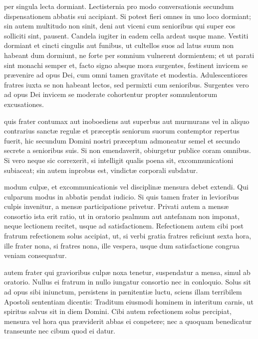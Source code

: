 \documentclass[fontsize=9pt,paper=A6,twoside,BCOR=1mm,DIV=22,headinclude]{scrarticle}
\begin{document}
\begin{multicols}{2}
 per singula lecta dormiant. Lectisternia pro modo conversationis secundum dispensationem abbatis sui accipiant. Si potest fieri omnes in uno loco dormiant; sin autem multitudo non sinit, deni aut viceni cum senioribus qui super eos solliciti sint, pausent. Candela iugiter in eadem cella ardeat usque mane. Vestiti dormiant et cincti cingulis aut funibus, ut cultellos suos ad latus suum non habeant dum dormiunt, ne forte per somnium vulnerent dormientem; et ut parati sint monachi semper et, facto signo absque mora surgentes, festinent invicem se prævenire ad opus Dei, cum omni tamen gravitate et modestia. Adulescentiores fratres iuxta se non habeant lectos, sed permixti cum senioribus. Surgentes vero ad opus Dei invicem se moderate cohortentur propter somnulentorum excusationes. 

 quis frater contumax aut inoboediens aut superbus aut murmurans vel in aliquo contrarius sanctæ regulæ et præceptis seniorum suorum contemptor repertus fuerit, hic secundum Domini nostri præceptum admoneatur semel et secundo secrete a senioribus suis. Si non emendaverit, obiurgetur publice coram omnibus. Si vero neque sic correxerit, si intelligit qualis poena sit, excommunicationi subiaceat; sin autem inprobus est, vindictæ corporali subdatur. 

 modum culpæ, et excommunicationis vel disciplinæ mensura debet extendi. Qui culparum modus in abbatis pendat iudicio. Si quis tamen frater in levioribus culpis invenitur, a mensæ participatione privetur. Privati autem a mensæ consortio ista erit ratio, ut in oratorio psalmum aut antefanam non imponat, neque lectionem recitet, usque ad satisfactionem. Refectionem autem cibi post fratrum refectionem solus accipiat, ut, si verbi gratia fratres reficiunt sexta hora, ille frater nona, si fratres nona, ille vespera, usque dum satisfactione congrua veniam consequatur. 

 autem frater qui gravioribus culpæ noxa tenetur, suspendatur a mensa, simul ab oratorio. Nullus ei fratrum in nullo iungatur consortio nec in conloquio. Solus sit ad opus sibi iniunctum, persistens in pænitentiæ luctu, sciens illam terribilem Apostoli sententiam dicentis: Traditum eiusmodi hominem in interitum carnis, ut spiritus salvus sit in diem Domini. Cibi autem refectionem solus percipiat, mensura vel hora qua præviderit abbas ei conpetere; nec a quoquam benedicatur transeunte nec cibum quod ei datur. 


\end{multicols}
\end{document}
